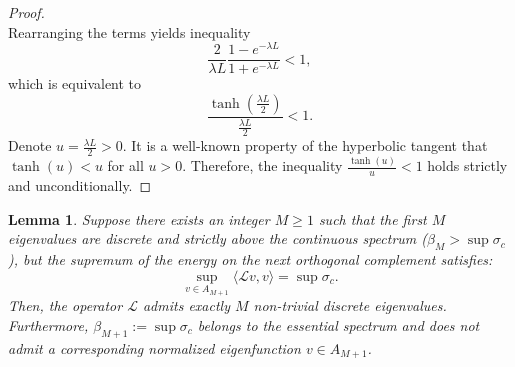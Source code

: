 \documentclass[11pt, a4paper]{article}
\theoremstyle{break}
\theoremstyle{break}
\theoremstyle{break}
\theoremstyle{break}
\theoremstyle{break}
\newtheorem{lem}{Lemma}[section]
\theoremstyle{break}
\theoremstyle{break}
\theoremstyle{break}
\theoremstyle{break}
\begin{document}
\begin{proof}
\begin{equation}
    \end{equation}
    Rearranging the terms yields inequality
    \begin{equation}
        \frac{2}{\lambda L} \frac{1 - e^{-\lambda L}}{1 + e^{-\lambda L}} < 1,
    \end{equation}
    which is equivalent to
    \begin{equation}
        \frac{\tanh\left(\frac{\lambda L}{2}\right)}{\frac{\lambda L}{2}} < 1.
    \end{equation}
    Denote $u = \frac{\lambda L}{2} > 0$. It is a well-known property of the hyperbolic tangent that $\tanh(u) < u$ for all $u > 0$. Therefore, the inequality $\frac{\tanh(u)}{u} < 1$ holds strictly and unconditionally.
\end{proof}

\begin{lem}
    \label{lem:termination}
    Suppose there exists an integer $M \geq 1$ such that the first $M$ eigenvalues are discrete and strictly above the continuous spectrum ($\beta_M > \sup \sigma_c$), but the supremum of the energy on the next orthogonal complement satisfies:
    \begin{equation}
        \sup_{v \in A_{M+1}} \langle \mathcal{L}v, v \rangle = \sup \sigma_c.
    \end{equation}
    Then, the operator $\mathcal{L}$ admits exactly $M$ non-trivial discrete eigenvalues. Furthermore, $\beta_{M+1} := \sup \sigma_c$ belongs to the essential spectrum and does not admit a corresponding normalized eigenfunction $v \in A_{M+1}$.
\end{lem}
\end{document}
